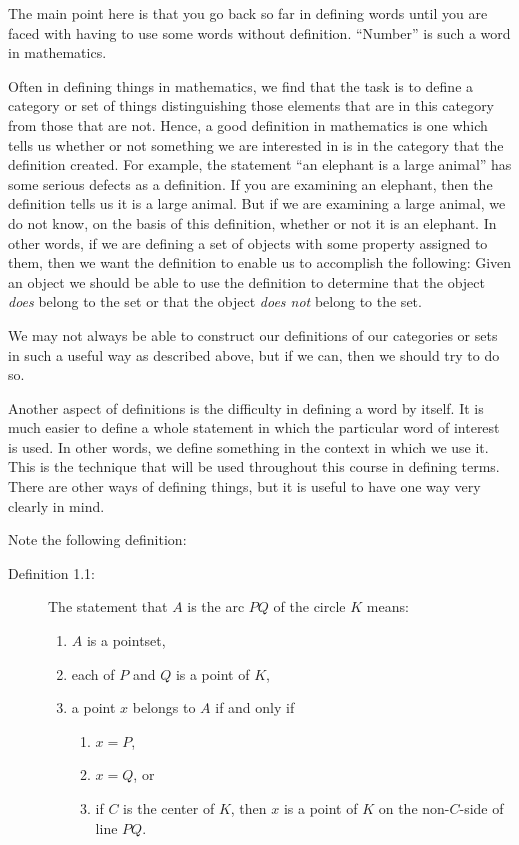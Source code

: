 \documentclass[english]{book}
\begin{document}
The main point here is that you go back so far in defining words until you are faced with having to use some words without definition. ``Number'' is such a word in mathematics.

Often in defining things in mathematics, we find that the task is to define a category or set of things distinguishing those elements that are in this category from those that are not. Hence, a good definition in mathematics is one which tells us whether or not something we are interested in is in the category that the definition created. For example, the statement ``an elephant is a large animal'' has some serious defects as a definition. If you are examining an elephant, then the definition tells us it is a large animal. But if we are examining a large animal, we do not know, on the basis of this definition, whether or not it is an elephant. In other words, if we are defining a set of objects with some property assigned to them, then we want the definition to enable us to accomplish the following: Given an object we should be able to use the definition to determine that the object \emph{does} belong to the set or that the object \emph{does not} belong to the set.

We may not always be able to construct our definitions of our categories or sets in such a useful way as described above, but if we can, then we should try to do so.

Another aspect of definitions is the difficulty in defining a word by itself. It is much easier to define a whole statement in which the particular word of interest is used. In other words, we define something in the context in which we use it. This is the technique that will be used throughout this course in defining terms. There are other ways of defining things, but it is useful to have one way very clearly in mind.

Note the following definition:

\begin{description}
\item[Definition 1.1:] The statement that $A$ is the arc $PQ$ of the circle $K$ means:
  \begin{enumerate}[\hspace{1cm}1)]
    \item $A$ is a pointset,
    \item each of $P$ and $Q$ is a point of $K$,
    \item a point $x$ belongs to $A$ if and only if
    \begin{enumerate}[\hspace{1cm}(a)]
      \item $x = P$,
      \item $x = Q$, or
      \item if $C$ is the center of $K$, then $x$ is a point of $K$ on the non-$C$-side of line $PQ$.
    \end{enumerate}
  \end{enumerate}
\end{description}
\end{document}
